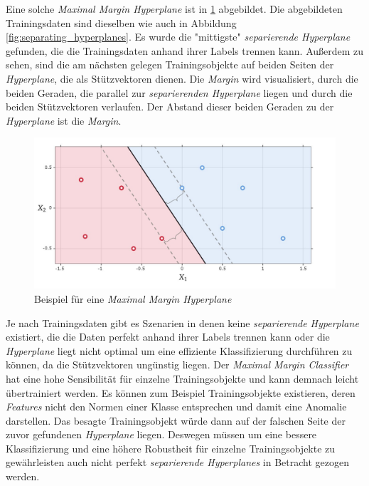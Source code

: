 Eine solche \textit{Maximal Margin Hyperplane} ist in \ref{fig:maximal_margin} abgebildet. Die abgebildeten Trainingsdaten sind dieselben
wie auch in Abbildung \ref{fig:separating_hyperplanes}. Es wurde die "mittigste" \textit{separierende Hyperplane} gefunden, die die Trainingsdaten
anhand ihrer Labels trennen kann. Außerdem zu sehen, sind die am nächsten gelegen Trainingsobjekte auf beiden Seiten der \textit{Hyperplane}, die als
Stützvektoren dienen. Die \textit{Margin} wird visualisiert, durch die beiden Geraden, die parallel zur \textit{separierenden Hyperplane} liegen und
durch die beiden Stützvektoren verlaufen. Der Abstand dieser beiden Geraden zu der \textit{Hyperplane} ist die \textit{Margin}.
\begin{figure}[H]
	\centering
	\includegraphics[width=\imgMed]{images/theory/maximal_margin.jpg}
	\caption{Beispiel für eine \textit{Maximal Margin Hyperplane}} 
	\label{fig:maximal_margin}
\end{figure}
Je nach Trainingsdaten gibt es Szenarien in denen keine \textit{separierende Hyperplane} existiert, die die Daten perfekt anhand ihrer Labels
trennen kann oder die \textit{Hyperplane} liegt nicht optimal um eine effiziente Klassifizierung durchführen zu können, da die
Stützvektoren ungünstig liegen. Der \textit{Maximal Margin Classifier} hat eine hohe Sensibilität für einzelne Trainingsobjekte
und kann demnach leicht übertrainiert werden. Es können zum Beispiel Trainingsobjekte existieren, deren \textit{Features} nicht den Normen einer Klasse entsprechen 
und damit eine Anomalie darstellen. Das besagte Trainingsobjekt würde dann auf der falschen Seite der zuvor gefundenen \textit{Hyperplane} liegen.
Deswegen müssen um eine bessere Klassifizierung und eine höhere Robustheit für einzelne Trainingsobjekte
zu gewährleisten auch nicht perfekt \textit{separierende Hyperplanes} in Betracht gezogen werden.\cite[S. 343 - 345]{james_2013}

